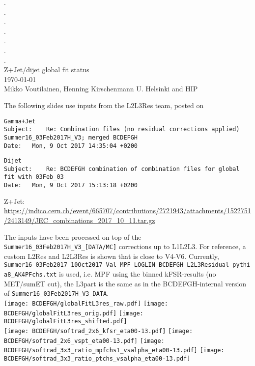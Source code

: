 \documentclass[landscape,10pt]{beamer} %
\begin{document}
\begin{centering}
{. }\\
{. }\\
{. }\\
{. }\\
{. }\\
{. }\\
{. }\\
Z+Jet/dijet global fit status\\
\today\\
Mikko Voutilainen, Henning Kirschenmann
U. Helsinki and HIP\\
\end{centering}
\newpage

The following slides use inputs from the L2L3Res team, posted on 
\begin{verbatim}
Gamma+Jet
Subject: 	Re: Combination files (no residual corrections applied) Summer16_03Feb2017H_V3; merged BCDEFGH
Date: 	Mon, 9 Oct 2017 14:35:04 +0200
\end{verbatim}

\begin{verbatim}
Dijet
Subject: 	Re: BCDEFGH combination of combination files for global fit with 03Feb_03
Date: 	Mon, 9 Oct 2017 15:13:18 +0200
\end{verbatim}

Z+Jet: 
\url{https://indico.cern.ch/event/665707/contributions/2721943/attachments/1522751/2413149/JEC_combinations_2017_10_11.tar.gz}

The inputs have been processed on top of the \verb|Summer16_03Feb2017H_V3_[DATA/MC]| corrections up to L1L2L3. For reference, a custom L2Res and L2L3Res is shown that is close to V4-V6. Currently, \verb|Summer16_03Feb2017_10Oct2017_Val_MPF_LOGLIN_BCDEFGH_L2L3Residual_pythia8_AK4PFchs.txt| is used, i.e. MPF using the binned kFSR-results (no MET/sumET cut), the L3part is the same as in the BCDEFGH-internal version of  \verb|Summer16_03Feb2017H_V3_DATA|. \\

\newpage
\texttt{[image: BCDEFGH/globalFitL3res\_raw.pdf]}
\texttt{[image: BCDEFGH/globalFitL3res\_orig.pdf]}
\texttt{[image: BCDEFGH/globalFitL3res\_shifted.pdf]}\\
\texttt{[image: BCDEFGH/softrad\_2x6\_kfsr\_eta00-13.pdf]}
\texttt{[image: BCDEFGH/softrad\_2x6\_vspt\_eta00-13.pdf]}
\texttt{[image: BCDEFGH/softrad\_3x3\_ratio\_mpfchs1\_vsalpha\_eta00-13.pdf]}
\texttt{[image: BCDEFGH/softrad\_3x3\_ratio\_ptchs\_vsalpha\_eta00-13.pdf]}\\
\end{document}
